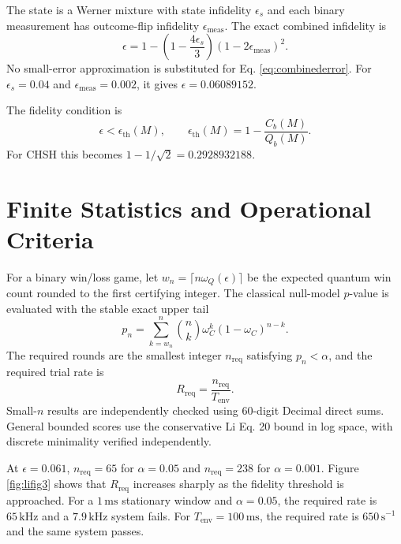 \documentclass[10pt]{article}
\begin{document}
The state is a Werner mixture with state infidelity $\epsilon_s$ and each
binary measurement has outcome-flip infidelity $\epsilon_{\mathrm{meas}}$.
The exact combined infidelity is
\begin{equation}
  \epsilon = 1-\left(1-\frac{4\epsilon_s}{3}\right)
  (1-2\epsilon_{\mathrm{meas}})^2.
  \label{eq:combinederror}
\end{equation}
No small-error approximation is substituted for Eq. \eqref{eq:combinederror}.
For $\epsilon_s=0.04$ and $\epsilon_{\mathrm{meas}}=0.002$, it gives
$\epsilon=0.06089152$.

The fidelity condition is
\begin{equation}
  \epsilon < \epsilon_{\mathrm{th}}(M), \qquad
  \epsilon_{\mathrm{th}}(M)=1-\frac{C_b(M)}{Q_b(M)}.
  \label{eq:fidelity}
\end{equation}
For CHSH this becomes $1-1/\sqrt{2}=0.2928932188$.

\section{Finite Statistics and Operational Criteria}

For a binary win/loss game, let $w_n=\lceil n\omega_Q(\epsilon)\rceil$ be the
expected quantum win count rounded to the first certifying integer.  The
classical null-model $p$-value is evaluated with the stable exact upper tail
\begin{equation}
  p_n=\sum_{k=w_n}^{n}{n\choose k}
  \omega_C^k(1-\omega_C)^{n-k}.
  \label{eq:binomial}
\end{equation}
The required rounds are the smallest integer $n_{\mathrm{req}}$ satisfying
$p_n<\alpha$, and the required trial rate is
\begin{equation}
  R_{\mathrm{req}}=\frac{n_{\mathrm{req}}}{T_{\mathrm{env}}}.
  \label{eq:rreq}
\end{equation}
Small-$n$ results are independently checked using 60-digit Decimal direct
sums.  General bounded scores use the conservative Li Eq. 20 bound in log
space, with discrete minimality verified independently.

At $\epsilon=0.061$, $n_{\mathrm{req}}=65$ for $\alpha=0.05$ and
$n_{\mathrm{req}}=238$ for $\alpha=0.001$.  Figure \ref{fig:lifig3} shows that
$R_{\mathrm{req}}$ increases sharply as the fidelity threshold is approached.
For a $1\,\mathrm{ms}$ stationary window and $\alpha=0.05$, the required rate
is $65\,\mathrm{kHz}$ and a $7.9\,\mathrm{kHz}$ system fails.  For
$T_{\mathrm{env}}=100\,\mathrm{ms}$, the required rate is
$650\,\mathrm{s}^{-1}$ and the same system passes.
\end{document}
